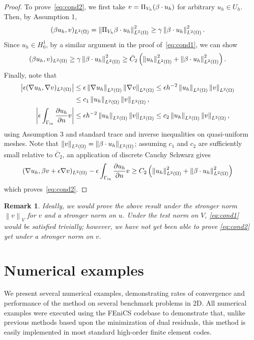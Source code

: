\documentclass[final,leqno]{siamltex}
\newcommand{\nor}[1]{\left\| #1 \right\|}
\newcommand{\LRp}[1]{\left( #1 \right)}
\newcommand{\LRb}[1]{\left| #1 \right|}
\newcommand{\Grad} {\ensuremath{\nabla}}
\renewcommand{\L}{L^2\LRp{\Omega}}
\let\grad\relax
\newcommand{\grad}{\nabla}
\newcommand{\pd}[2]{\frac{\partial#1}{\partial#2}}
\newtheorem{remark}{Remark}
\begin{document}
\begin{proof}
To prove~\ref{eq:cond2}, we first take $v = \Pi_{V_h}(\beta\cdot \grad u_h)$ for arbitrary $u_h\in U_h$.  Then, by Assumption 1,
\[
(\beta \grad u_h,v)_{\L} = \nor{\Pi_{V_h}\beta\cdot\grad u_h}_{\L}^2 \geq \gamma \nor{\beta\cdot\grad u_h}_{\L}^2.
\]
Since $u_h\in H^1_0$, by a similar argument in the proof of~\ref{eq:cond1}, we can show
\[
(\beta \grad u_h,v)_{\L} \geq \gamma \nor{\beta\cdot\grad u_h}_{\L}^2 \geq \bar{C}_2 \LRp{\nor{u_h}_{\L}^2 + \nor{\beta\cdot\grad u_h}_{\L}^2}.
\]
Finally, note that
\begin{align*}
\LRb{\epsilon (\Grad u_h, \Grad v)_{\L}} &\leq \epsilon \nor{\Grad u_h}_{\L}\nor{\Grad v}_{\L} \leq \epsilon h^{-2} \nor{u_h}_{\L}\nor{v}_{\L} \\
&\leq c_1 \nor{u_h}_{\L}\nor{v}_{\L},\\
\LRb{\epsilon\int_{\Gamma_{\rm in}} \pd{u_h}{n}v} &\leq  \epsilon h^{-2} \nor{u_h}_{\L}\nor{v}_{\L} \leq c_2\nor{u_h}_{\L}\nor{v}_{\L},
\end{align*}
using Assumption 3 and standard trace and inverse inequalities on quasi-uniform meshes.  Note that $\nor{v}_{\L} = \nor{\beta\cdot\grad u_h}_{\L}$; assuming $c_1$ and $c_2$ are sufficiently small relative to $\bar{C}_2$, an application of discrete Cauchy Schwarz gives 
\[
(\Grad u_h, \beta v + \epsilon \Grad v)_{\L} - \epsilon\int_{\Gamma_{\rm in}}\pd{u_h}{n}v \geq C_2 \LRp{\nor{u_h}^2_{\L} + \nor{\beta\cdot\grad u_h}^2_{\L}}
\]
which proves~\ref{eq:cond2}.
\end{proof}

\begin{remark}
Ideally, we would prove the above result under the stronger norm $\nor{v}_V$ for $v$ and a stronger norm on $u$.  Under the test norm on $V$, \ref{eq:cond1} would be satisfied trivially; however, we have not yet been able to prove \ref{eq:cond2} yet under a stronger norm on $v$.  
\end{remark}
\section{Numerical examples}

We present several numerical examples, demonstrating rates of convergence and performance of the method on several benchmark problems in 2D.  All numerical examples were executed using the %
 FEniCS codebase \cite{LoggMardalEtAl2012a} to demonstrate that, unlike previous methods based upon the minimization of dual residuals, this method is easily implemented in most standard high-order finite element codes.  
\end{document}
